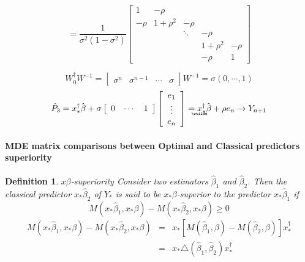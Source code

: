 \documentclass{article}
\newtheorem{definition}[theorem]{Definition}
\begin{document}
\begin{equation*}
=\frac{1}{\sigma ^{2}\left( 1-\sigma ^{2}\right) }\left[ 
\begin{array}{ccccc}
1 & -\rho &  &  &  \\ 
-\rho & 1+\rho ^{2} & -\rho &  &  \\ 
&  & \ddots & -\rho &  \\ 
&  &  & 1+\rho ^{2} & -\rho \\ 
&  &  & -\rho & 1%
\end{array}%
\right]
\end{equation*}

\begin{equation*}
W_{0}^{\dagger }W^{-1}=\left[ 
\begin{array}{cccc}
\sigma ^{n} & \sigma ^{n-1} & \cdots  & \sigma 
\end{array}%
\right] W^{-1}=\sigma \left( 0,\cdots ,1\right) 
\end{equation*}%
\begin{equation*}
\hat{P}_{3}=x_{\ast }^{\dagger }\hat{\beta}+\sigma \left[ 
\begin{array}{ccc}
0 & \cdots  & 1%
\end{array}%
\right] \left[ 
\begin{array}{c}
e_{1} \\ 
\vdots  \\ 
e_{n}%
\end{array}%
\right] =%
\underaccent{\wtilde}{x}%
_{\ast }^{\dagger }\hat{\beta}+\rho e_{n}\rightarrow Y_{n+1}
\end{equation*}

\bigskip 

\paragraph{MDE matrix comparisons between Optimal and Classical predictors
superiority}

\begin{definition}
$x\beta $-superiority\newline
Consider two estimators $\hat{\beta}_{1}$ and $\hat{\beta}_{2}$. Then the
classical predictor $x_{\ast }\hat{\beta}_{2}$ of $Y_{\ast }$ is said to be $%
x_{\ast }\beta $-superior to the predictor $x_{\ast }\hat{\beta}_{1}$ if%
\begin{equation*}
M\left( x_{\ast }\hat{\beta}_{1},x_{\ast }\beta \right) -M\left( x_{\ast }%
\hat{\beta}_{2},x_{\ast }\beta \right) \geq 0
\end{equation*}%
\begin{eqnarray*}
M\left( x_{\ast }\hat{\beta}_{1},x_{\ast }\beta \right) -M\left( x_{\ast }%
\hat{\beta}_{2},x_{\ast }\beta \right)  &=&x_{\ast }\left[ M\left( \hat{\beta%
}_{1},\beta \right) -M\left( \hat{\beta}_{2},\beta \right) \right] x_{\ast
}^{\dagger } \\
&=&x_{\ast }\triangle \left( \hat{\beta}_{1},\hat{\beta}_{2}\right) x_{\ast
}^{\dagger }
\end{eqnarray*}
\end{definition}
\end{document}
